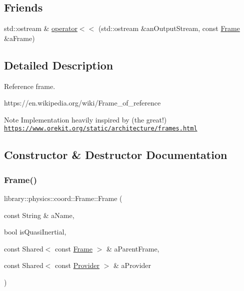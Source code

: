 \subsection*{Friends}
\begin{DoxyCompactItemize}
\item 
std\+::ostream \& \hyperlink{classlibrary_1_1physics_1_1coord_1_1_frame_a509ac1926cfc3553748bace204e2b1cc}{operator$<$$<$} (std\+::ostream \&an\+Output\+Stream, const \hyperlink{classlibrary_1_1physics_1_1coord_1_1_frame}{Frame} \&a\+Frame)
\end{DoxyCompactItemize}


\subsection{Detailed Description}
Reference frame. 

https\+://en.wikipedia.\+org/wiki/\+Frame\+\_\+of\+\_\+reference \begin{DoxyNote}{Note}
Implementation heavily inspired by (the great!) \href{https://www.orekit.org/static/architecture/frames.html}{\tt https\+://www.\+orekit.\+org/static/architecture/frames.\+html} 
\end{DoxyNote}


\subsection{Constructor \& Destructor Documentation}
\mbox{\label{classlibrary_1_1physics_1_1coord_1_1_frame_a6a8410c8b29584fe2c2c78370c72f695}} 
\subsubsection{\texorpdfstring{Frame()}{Frame()}\hspace{0.1cm}{\footnotesize\ttfamily [1/2]}}
{\footnotesize\ttfamily library\+::physics\+::coord\+::\+Frame\+::\+Frame (\begin{DoxyParamCaption}\item[{const String \&}]{a\+Name,  }\item[{bool}]{is\+Quasi\+Inertial,  }\item[{const Shared$<$ const \hyperlink{classlibrary_1_1physics_1_1coord_1_1_frame}{Frame} $>$ \&}]{a\+Parent\+Frame,  }\item[{const Shared$<$ const \hyperlink{classlibrary_1_1physics_1_1coord_1_1frame_1_1_provider}{Provider} $>$ \&}]{a\+Provider }\end{DoxyParamCaption})}

